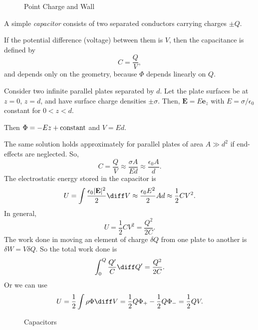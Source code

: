 \documentclass[12pt]{article}
\begin{document}
\begin{figure}[h]
	\centering
	\caption{Point Charge and Wall}
	\label{fig:point_charge_and_wall}
\end{figure}

A simple \emph{capacitor} consists of two separated conductors carrying charges $\pm Q$.

If the potential difference (voltage) between them is $V$, then the capacitance is defined by
\[
C = \frac{Q}{V}
,\]
and depends only on the geometry, because $\Phi$ depends linearly on $Q$.

\begin{exbox}
	Consider two infinite parallel plates separated by $d$. Let the plate surfaces be at $z = 0$, $z = d$, and have surface charge densities $\pm \sigma$. Then, $\mathbf{E} = E \mathbf{e}_z$ with $E = \sigma/\epsilon_0$ constant for $0 < z < d$.

	Then $\Phi = - Ez + \rm{constant}$ and $V = Ed$.

	The same solution holds approximately for parallel plates of area $A \gg d^2$ if end-effects are neglected. So,
	\[
	C = \frac{Q}{V} \approx \frac{\sigma A}{E d} \approx \frac{\epsilon_0 A}{d}
	.\]
	The electrostatic energy stored in the capacitor is
	\[
	U = \int \frac{\epsilon_0 |\mathbf{E}|^2}{2} \diff V \approx \frac{\epsilon_0 E^2}{2} A d \approx \frac{1}{2} CV^2
	.\]
	In general,
	\[
	U = \frac{1}{2} CV^2 = \frac{Q^2}{2C}
	.\]
	The work done in moving an element of charge $\delta Q$ from one plate to another is $\delta W = V \delta Q$. So the total work done is
	\[
	\int_{0}^{Q} \frac{Q'}{C} \diff Q' = \frac{Q^2}{2C}
	.\]
	Or we can use
	\[
	U = \frac{1}{2} \int \rho \Phi \diff V = \frac{1}{2} Q \Phi_{+} - \frac{1}{2} Q \Phi_{-} = \frac{1}{2} Q V
	.\]
\end{exbox}

\begin{figure}[h]
	\centering
	\caption{Capacitors}
	\label{fig:capacitors}
\end{figure}
\newpage

\printindex
\end{document}
